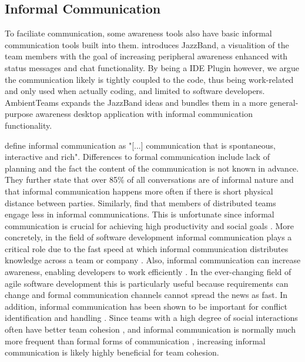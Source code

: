 \subsection{Informal Communication}

To faciliate communication, some awareness tools also have basic informal communication tools built into them. \textcite{cheng2003jazzing} introduces JazzBand, a visualition of the team members with the goal of increasing peripheral awareness enhanced with status messages and chat functionality. By being a IDE Plugin however, we argue the communication likely is tightly coupled to the code, thus being work-related and only used when actually coding, and limited to software developers. AmbientTeams expands the JazzBand ideas and bundles them in a more general-purpose awareness desktop application with informal communication functionality.

\textcite{kraut1990informal} define informal communication as "[...] communication that is spontaneous, interactive and rich". Differences to formal communication include lack of planning and the fact the content of the communication is not known in advance. They further state that over 85\% of all conversations are of informal nature and that informal communication happens more often if there is short physical distance between parties. Similarly, \textcite{hinds2005understanding} find that members of distributed teams engage less in informal communications. This is unfortunate since informal communication is crucial for achieving high productivity and social goals \autocite{kraut1990informal}. More concretely, in the field of software development informal communication plays a critical role due to the fast speed at which informal communication distributes knowledge across a team or company \autocite{french1998study, mockus2001challenges}. Also, informal communication can increase awareness, enabling developers to work efficiently \autocite{herbsleb2001global}. In the ever-changing field of agile software development this is particularly useful because requirements can change and formal communication channels cannot spread the news as fast. In addition, informal communication has been shown to be important for conflict identification and handling \autocite{hinds2005understanding}. Since teams with a high degree of social interactions often have better team cohesion \autocite{staehle2014management}, and informal communication is normally much more frequent than formal forms of communication \autocite{kraut1990informal}, increasing informal communication is likely highly beneficial for team cohesion.

